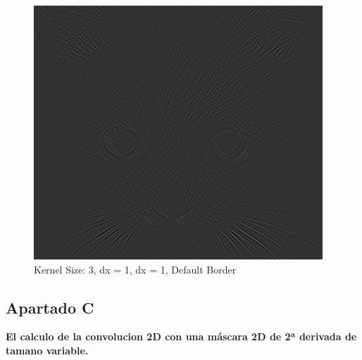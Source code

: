 \documentclass{article}
\begin{document}
\begin{minipage}{\linewidth}
    \centering
    \begin{minipage}{0.45\linewidth}
        \begin{figure}[H]
			\includegraphics[width=\linewidth]{Ejercicio2b/cat(3,1,1)_DEFAULT.png}             
			\caption{Kernel Size: 3, dx = 1, dx = 1,  Default Border}
        \end{figure}
    \end{minipage}   
\end{minipage}

\subsection*{Apartado C}
\textbf{El calculo de la convolucion 2D con una máscara 2D de 2ª derivada de tamano variable.}
\end{document}
